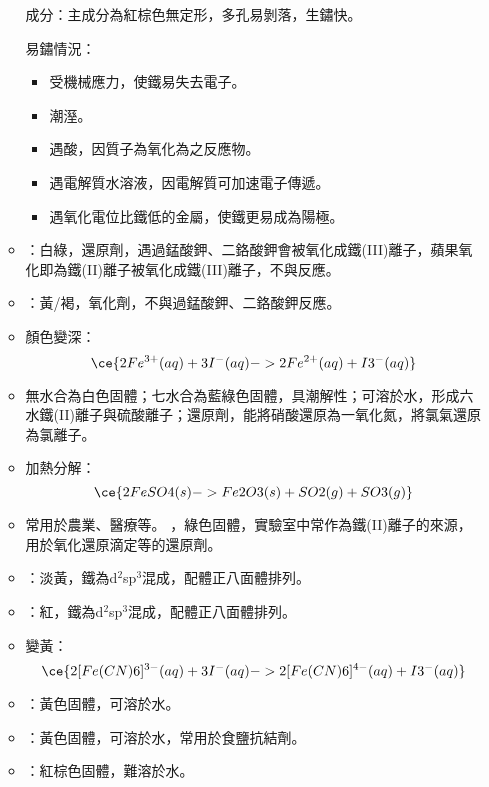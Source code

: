 \documentclass[a4paper,12pt]{report}
\begin{document}
\begin{itemize}
\begin{itemize}
成分：主成分為紅棕色無定形，多孔易剝落，生鏽快。

易鏽情況：
\begin{itemize}
\item 受機械應力，使鐵易失去電子。
\item 潮溼。
\item 遇酸，因質子為氧化為之反應物。
\item 遇電解質水溶液，因電解質可加速電子傳遞。
\item 遇氧化電位比鐵低的金屬，使鐵更易成為陽極。
\end{itemize}
\bit
\item {}：白綠，還原劑，遇過錳酸鉀、二鉻酸鉀會被氧化成鐵(III)離子，蘋果氧化即為鐵(II)離子被氧化成鐵(III)離子，不與反應。
\item {}：黃/褐，氧化劑，不與過錳酸鉀、二鉻酸鉀反應。
\item {}顏色變深：
\[\ce{2Fe^{3+}(aq) + 3I^-(aq) -> 2Fe^{2+}(aq) + I3^-(aq)}\]
\eit
{}
\bit
\item 無水合為白色固體；七水合為藍綠色固體，具潮解性；可溶於水，形成六水鐵(II)離子與硫酸離子；還原劑，能將硝酸還原為一氧化氮，將氯氣還原為氯離子。
\item 加熱分解：
\[\ce{2FeSO4(s) -> Fe2O3(s) + SO2(g) + SO3(g)}\]
\item 常用於農業、醫療等。
\eit
{}
，綠色固體，實驗室中常作為鐵(II)離子的來源，用於氧化還原滴定等的還原劑。
\bit
\item {}：淡黃，鐵為d$^2$sp$^3$混成，配體正八面體排列。
\item {}：紅，鐵為d$^2$sp$^3$混成，配體正八面體排列。
\item {}變黃：
\[\ce{2[Fe(CN)6]^{3-}(aq) + 3I^-(aq) -> 2[Fe(CN)6]^{4-}(aq) + I3^-(aq)}\]
\item {}：黃色固體，可溶於水。
\item {}：黃色固體，可溶於水，常用於食鹽抗結劑。
\item {}：紅棕色固體，難溶於水。

\end{itemize}
\end{itemize}
\end{document}
